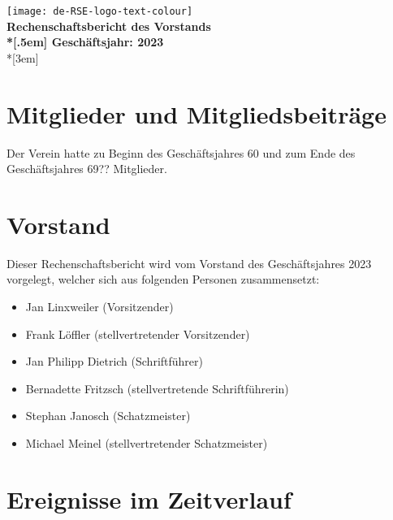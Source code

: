 \newcommand{\jahr}{2023}



\thispagestyle{empty}

\begin{centering}
\texttt{[image: de-RSE-logo-text-colour]}\\
\vspace{3em}
\textbf{
 \Large Rechenschaftsbericht des Vorstands\\*[.5em]
 \normalsize Geschäftsjahr: \jahr}\\*[3em]
\end{centering}

\section{Mitglieder und Mitgliedsbeiträge}

Der Verein hatte zu Beginn des Geschäftsjahres 60 und zum Ende des Geschäftsjahres 69?? Mitglieder.

\section{Vorstand}

Dieser Rechenschaftsbericht wird vom Vorstand des Geschäftsjahres 2023 vorgelegt, welcher sich aus folgenden Personen zusammensetzt:

\begin{itemize}
  \setlength{\itemsep}{0pt plus 1pt}
  \item Jan Linxweiler (Vorsitzender)
  \item Frank Löffler (stellvertretender Vorsitzender)
  \item Jan Philipp Dietrich (Schriftführer)
  \item Bernadette Fritzsch (stellvertretende Schriftführerin)
  \item Stephan Janosch (Schatzmeister)
  \item Michael Meinel (stellvertretender Schatzmeister)
\end{itemize}

\section{Ereignisse im Zeitverlauf}

